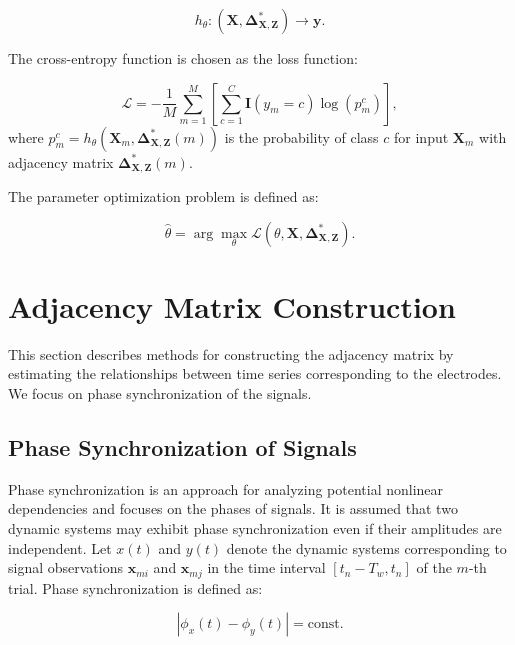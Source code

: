 \documentclass[12pt, twoside]{article}
\begin{document}
\begin{equation}
    h_\theta : (\mathbf{X}, \mathbf{\Delta}_{\mathbf{X},\mathbf{Z}}^*) \to \mathbf{y}.
\end{equation}

The cross-entropy function is chosen as the loss function:

\begin{equation}
    \mathcal{L} = -\frac{1}{M} \sum_{m=1}^M \left[ \sum_{c=1}^C \mathbf{I}(y_m = c) \log(p_m^c) \right],
\end{equation}
where $p_m^c = h_\theta \left( \mathbf{X}_m, \mathbf{\Delta}_{\mathbf{X},\mathbf{Z}}^*(m) \right)$ is the probability of class $c$ for input $\mathbf{X}_m$ with adjacency matrix $\mathbf{\Delta}_{\mathbf{X},\mathbf{Z}}^*(m)$.

The parameter optimization problem is defined as:

\begin{equation}
    \hat{\theta} = \arg \max_{\theta} \mathcal{L}(\theta, \mathbf{X}, \mathbf{\Delta}_{\mathbf{X},\mathbf{Z}}^*).
\end{equation}

\section{Adjacency Matrix Construction}

This section describes methods for constructing the adjacency matrix by estimating the relationships between time series corresponding to the electrodes. We focus on phase synchronization of the signals.

\subsection{Phase Synchronization of Signals}

Phase synchronization is an approach for analyzing potential nonlinear dependencies and focuses on the phases of signals. It is assumed that two dynamic systems may exhibit phase synchronization even if their amplitudes are independent. Let $x(t)$ and $y(t)$ denote the dynamic systems corresponding to signal observations $\mathbf{x}_{mi}$ and $\mathbf{x}_{mj}$ in the time interval $[t_n - T_w, t_n]$ of the $m$-th trial. Phase synchronization is defined as:

\begin{equation}
|\phi_x(t) - \phi_y(t)| = \text{const}.
\end{equation}
\end{document}
